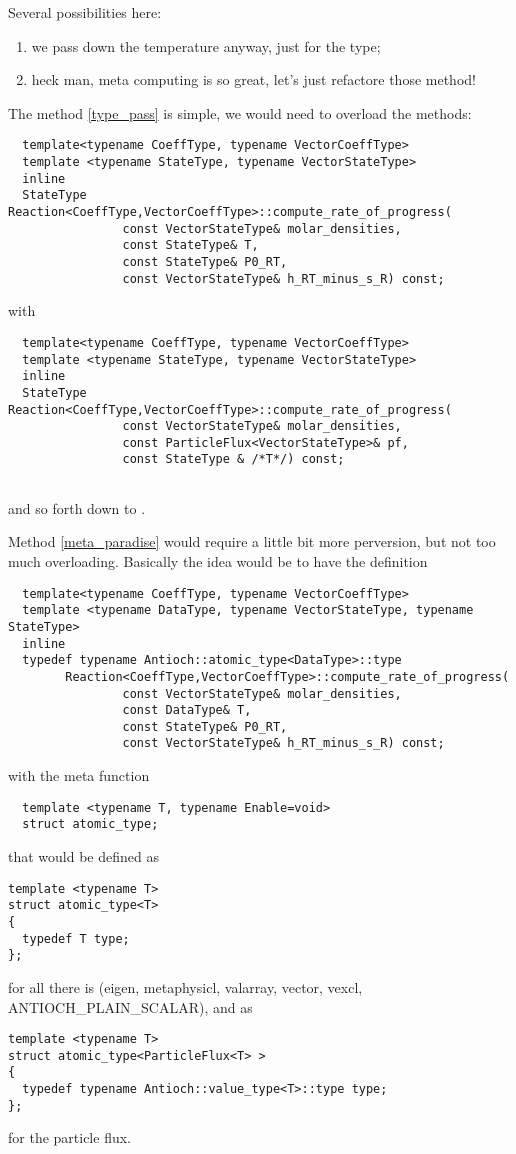 Several possibilities here:
\begin{enumerate}
\item\label{type_pass} we pass down the temperature anyway, just for the type;
\item\label{meta_paradise} heck man, meta computing is so great, let's just refactore those method!
\end{enumerate}

The method \ref{type_pass} is simple, we would need to overload the methods:
\begin{verbatim}
  template<typename CoeffType, typename VectorCoeffType>
  template <typename StateType, typename VectorStateType>
  inline
  StateType Reaction<CoeffType,VectorCoeffType>::compute_rate_of_progress( 
                const VectorStateType& molar_densities,
                const StateType& T,  
                const StateType& P0_RT,  
                const VectorStateType& h_RT_minus_s_R) const;
\end{verbatim}
with
\begin{verbatim}
  template<typename CoeffType, typename VectorCoeffType>
  template <typename StateType, typename VectorStateType>
  inline
  StateType Reaction<CoeffType,VectorCoeffType>::compute_rate_of_progress( 
                const VectorStateType& molar_densities,
                const ParticleFlux<VectorStateType>& pf,
                const StateType & /*T*/) const;
                
\end{verbatim}
and so forth down to \KineticsType.

Method \ref{meta_paradise} would require a little bit more perversion, but not
too much overloading. Basically the idea would be to have the definition
\begin{verbatim}
  template<typename CoeffType, typename VectorCoeffType>
  template <typename DataType, typename VectorStateType, typename StateType>
  inline
  typedef typename Antioch::atomic_type<DataType>::type
        Reaction<CoeffType,VectorCoeffType>::compute_rate_of_progress( 
                const VectorStateType& molar_densities,
                const DataType& T,  
                const StateType& P0_RT,  
                const VectorStateType& h_RT_minus_s_R) const;
\end{verbatim}
with the meta function
\begin{verbatim}
  template <typename T, typename Enable=void>
  struct atomic_type;
\end{verbatim}
that would be defined as
\begin{verbatim}
template <typename T>
struct atomic_type<T>
{
  typedef T type;
};
\end{verbatim}
for all there is (eigen, metaphysicl, valarray, vector, vexcl, ANTIOCH\_PLAIN\_SCALAR), and
as
\begin{verbatim}
template <typename T>
struct atomic_type<ParticleFlux<T> >
{
  typedef typename Antioch::value_type<T>::type type;
};
\end{verbatim}
for the particle flux.

